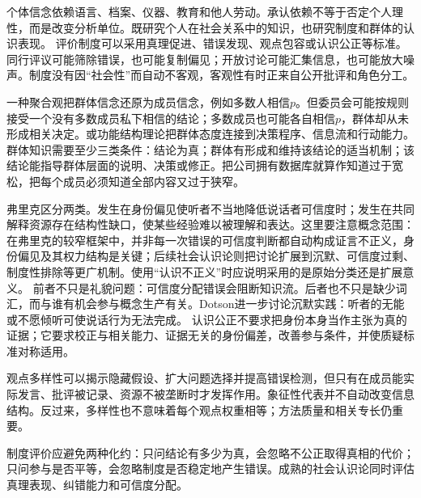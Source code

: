 个体信念依赖语言、档案、仪器、教育和他人劳动。承认依赖不等于否定个人理性，而是改变分析单位。既研究个人在社会关系中的知识，也研究制度和群体的认识表现\parencite{goldman1999,longino1990}。 评价制度可以采用真理促进、错误发现、观点包容或认识公正等标准。同行评议可能筛除错误，也可能复制偏见；开放讨论可能汇集信息，也可能放大噪声。制度没有因“社会性”而自动不客观，客观性有时正来自公开批评和角色分工。

一种聚合观把群体信念还原为成员信念，例如多数人相信$p$。但委员会可能按规则接受一个没有多数成员私下相信的结论；多数成员也可能各自相信$p$，群体却从未形成相关决定。或功能结构理论把群体态度连接到决策程序、信息流和行动能力。 群体知识需要至少三类条件：结论为真；群体有形成和维持该结论的适当机制；该结论能指导群体层面的说明、决策或修正。把公司拥有数据库就算作知道过于宽松，把每个成员必须知道全部内容又过于狭窄。

弗里克区分两类\parencite{fricker2007}。发生在身份偏见使听者不当地降低说话者可信度时；发生在共同解释资源存在结构性缺口，使某些经验难以被理解和表达。这里要注意概念范围：在弗里克的较窄框架中，并非每一次错误的可信度判断都自动构成证言不正义，身份偏见及其权力结构是关键；后续社会认识论则把讨论扩展到沉默、可信度过剩、制度性排除等更广机制。使用“认识不正义”时应说明采用的是原始分类还是扩展意义。 前者不只是礼貌问题：可信度分配错误会阻断知识流。后者也不只是缺少词汇，而与谁有机会参与概念生产有关。Dotson进一步讨论沉默实践：听者的无能或不愿倾听可使说话行为无法完成\parencite{dotson2011}。 认识公正不要求把身份本身当作主张为真的证据；它要求校正与相关能力、证据无关的身份偏差，改善参与条件，并使质疑标准对称适用。

观点多样性可以揭示隐藏假设、扩大问题选择并提高错误检测，但只有在成员能实际发言、批评被记录、资源不被垄断时才发挥作用。象征性代表并不自动改变信息结构。反过来，多样性也不意味着每个观点权重相等；方法质量和相关专长仍重要。

\begin{argumentbox}
制度评价应避免两种化约：只问结论有多少为真，会忽略不公正取得真相的代价；只问参与是否平等，会忽略制度是否稳定地产生错误。成熟的社会认识论同时评估真理表现、纠错能力和可信度分配。
\end{argumentbox}

